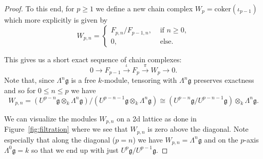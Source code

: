 \begin{proof}
  To this end, for $ p \geq 1 $ we define a new chain complex $ W_p = \text{coker}(\iota_{p - 1}) $ which more explicitly is given by
  \begin{equation}
    W_{p, n} = \begin{cases}
      F_{p, n}/F_{p-1, n}, &\text{ if } n \geq 0,\\
      0, &\text{ else}.
    \end{cases}
  \end{equation}

  This gives us a short exact sequence of chain complexes:
  \begin{equation}
    \label{eq:ses}
    0 \to F_{p - 1} \xrightarrow{\iota} F_p \xrightarrow{\pi} W_p \to 0.
  \end{equation}
  Note that, since $ \Lambda^{n}\mathfrak{g} $ is a free $ k $-module, tensoring with $ \Lambda^{n}\mathfrak{g} $ preserves exactness and so for $ 0\leq n \leq p $ we have
  \begin{equation}
    W_{p, n} = (U^{p - n}\mathfrak{g}\otimes_k \Lambda^{n}\mathfrak{g}) /(U^{p - n - 1}\mathfrak{g}\otimes_k \Lambda^{n}\mathfrak{g}) \cong (U^{p - n}\mathfrak{g} /U^{p - n - 1}\mathfrak{g})\otimes_k \Lambda^{n}\mathfrak{g}.
  \end{equation}

  We can visualize the modules $ W_{p, n} $ on a 2d lattice as done in Figure~\ref{fig:filtration} where we see that $ W_{p, n} $ is zero above the diagonal. Note especially that along the diagonal ($ p = n $) we have $ W_{p, n} = \Lambda^{n}\mathfrak{g} $ and on the $ p $-axis $ \Lambda^{0}\mathfrak{g} = k $ so that we end up with just $ U^{p}\mathfrak{g}/U^{p-1}\mathfrak{g} $.


\end{proof}

